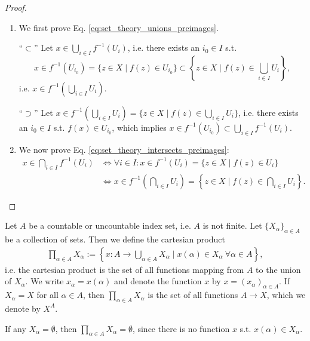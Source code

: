 \begin{proof}
	\begin{enumerate}
		\item We first prove Eq. \eqref{eq:set_theory_unions_preimages}. 		
		
		\enquote{$\subset$} Let $x\in \bigcup_{i\in I}f^{-1}(U_i)$, i.e. there exists an $i_0\in I$ s.t. $$x\in f^{-1}(U_{i_0}) = \{z\in X\mid f(z)\in U_{i_0}\} \subset \left\{ z\in X\mid f(z)\in \bigcup_{i\in I}U_i \right\},$$
		i.e. $x\in f^{-1}\left(\bigcup_{i\in I}U_i\right)$.
		
		\enquote{$\supset$} Let $x\in f^{-1}(\bigcup_{i\in I}U_i) = \{z\in X \mid f(z)\in \bigcup_{i\in I}U_i\}$, i.e. there exists an $i_0\in I$ s.t. $f(x)\in U_{i_0}$, which implies $x\in f^{-1}(U_{i_0}) \subset \bigcup_{i\in I}f^{-1}(U_i)$.
		
		\item We now prove Eq. \eqref{eq:set_theory_intersects_preimages}:
		\begin{align*}
			x\in \bigcap_{i\in I}f^{-1}(U_i) &\Leftrightarrow \forall i\in I: x\in f^{-1}(U_i) = \{z\in X\mid f(z)\in U_i\}
			\\ &\Leftrightarrow x\in f^{-1}\left(\bigcap_{i\in I}U_i\right) = \left\{z\in X\mid f(z)\in \bigcap_{i\in I}U_i\right\}.
		\end{align*}
	\end{enumerate}
\end{proof}

\begin{defn}\label{defn:infinite_cartesian_prods}
	Let $A$ be a countable or uncountable index set, i.e. $A$ is not finite. Let $\{X_{\alpha}\}_{\alpha\in A}$ be a collection of sets. Then we define the cartesian product
	\begin{align}
		\prod_{\alpha\in A}X_{\alpha} := \left\{x: A\to\bigcup_{\alpha\in A}X_{\alpha} \mid x(\alpha)\in X_{\alpha} \ \forall \alpha\in A\right\},
	\end{align}
	i.e. the cartesian product is the set of all functions mapping from $A$ to the union of $X_{\alpha}$. We write $x_{\alpha} = x(\alpha)$ and denote the function $x$ by $x = (x_{\alpha})_{\alpha\in A}$. If $X_{\alpha} = X$ for all $\alpha\in A$, then $\prod_{\alpha\in A}X_{\alpha}$ is the set of all functions $A\to X$, which we denote by $X^{A}$.
\end{defn}

\begin{remark}
	If any $X_{\alpha} = \emptyset$, then $\prod_{\alpha\in A}X_{\alpha} = \emptyset$, since there is no function $x$ s.t. $x(\alpha) \in X_{\alpha}$.
\end{remark}

